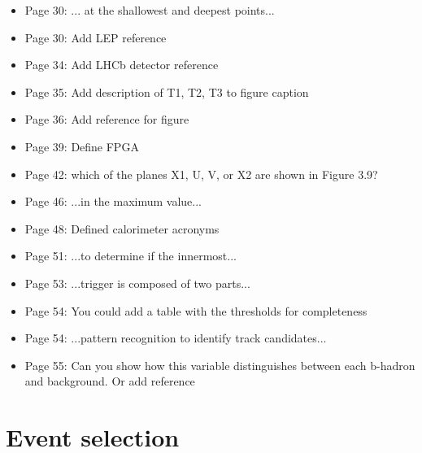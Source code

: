 \documentclass[12pt]{article}
\begin{document}
\begin{itemize}
\item Page 30: ... at the {\color{red}shallowest and deepest} points...
\item Page 30: {\color{blue} Add LEP reference}
\item Page 34: {\color{blue} Add LHCb detector reference}
\item Page 35: {\color{blue} Add description of T1, T2, T3 to figure caption}
\item Page 36: {\color{blue} Add reference for figure}
\item Page 39: {\color{blue} Define FPGA}
\item Page 42: {\color{blue} which of the planes X1, U, V, or X2 are shown in Figure 3.9?}
\item Page 46: ...in the {\color{red}maximum} value...
\item Page 48: Defined calorimeter acronyms
\item Page 51: ...to determine {\color{red}if} the innermost...
\item Page 53: ...trigger is composed {\color{red}of} two parts...
\item Page 54: {\color{blue} You could add a table with the thresholds for completeness}
\item Page 54: ...pattern recognition {\color{red}to} identify track candidates...
\item Page 55: {\color{blue}Can you show how this variable distinguishes between each b-hadron and background. Or add reference}
\end{itemize}

\section{Event selection}
\end{document}
